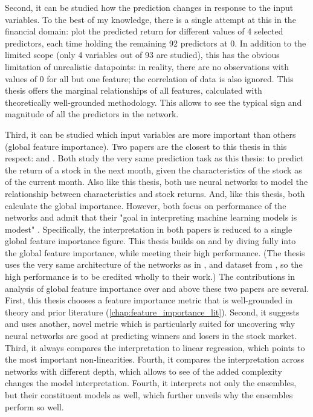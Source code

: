 			Second, it can be studied how the prediction changes in response to the input variables. To the best of my knowledge, there is a single attempt at this in the financial domain: \cite{gu2020empirical} plot the predicted return for different values of 4 selected predictors, each time holding the remaining 92 predictors at 0. In addition to the limited scope (only 4 variables out of 93 are studied), this has the obvious limitation of unrealistic datapoints: in reality, there are no observations with values of 0 for all but one feature; the correlation of data is also ignored. This thesis offers the marginal relationships of all features, calculated with theoretically well-grounded methodology. This allows to see the typical sign and magnitude of all the predictors in the network.
			
			Third, it can be studied which input variables are more important than others (global feature importance). Two papers are the closest to this thesis in this respect: \cite{gu2020empirical} and \cite{tobek2020does}. Both study the very same prediction task as this thesis: to predict the return of a stock in the next month, given the characteristics of the stock as of the current month. Also like this thesis, both use neural networks to model the relationship between characteristics and stock returns. And, like this thesis, both calculate the global importance. However, both focus on performance of the networks and admit that their "goal in interpreting machine learning models is modest" \cite[p.~2247]{gu2020empirical}. Specifically, the interpretation in both papers is reduced to a single global feature importance figure. This thesis builds on \cite{gu2020empirical} and \cite{tobek2020does} by diving fully into the global feature importance, while meeting their high performance. (The thesis uses the very same architecture of the networks as in \cite{gu2020empirical}, and dataset from \cite{tobek2020does}, so the high performance is to be credited wholly to their work.) The contributions in analysis of global feature importance over and above these two papers are several. First, this thesis chooses a feature importance metric that is well-grounded in theory and prior literature (\ref{chap:feature_importance_lit}). Second, it suggests and uses another, novel metric which is particularly suited for uncovering why neural networks are good at predicting winners and losers in the stock market. Third, it always compares the interpretation to linear regression, which points to the most important non-linearities. Fourth, it compares the interpretation across networks with different depth, which allows to see of the added complexity changes the model interpretation. Fourth, it interprets not only the ensembles, but their constituent models as well, which further unveils why the ensembles perform so well.     		
			
